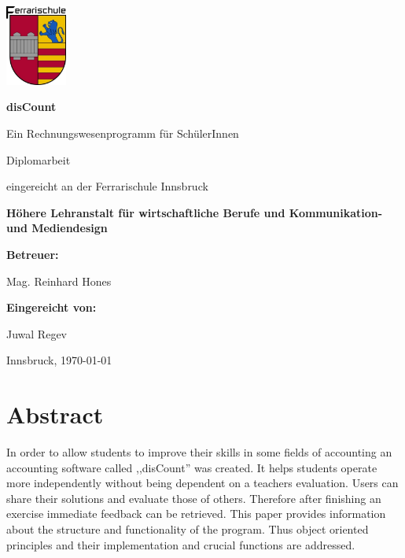 \documentclass[12pt]{report}
\begin{document}
  
   
  
\begin{titlepage}
	\centering
	\includegraphics[width=0.15\textwidth]{images/ferrarilogo.jpg}\par\vspace{1cm}
	\vspace{3cm}
	{\huge \textbf{disCount}\par}
	\vspace{0.5cm}
	{\huge Ein Rechnungswesenprogramm für SchülerInnen}\par
			
	\vspace{1.5cm}
			
	{\huge Diplomarbeit\par}
			
	\vspace{1.5cm}
			
	{\large eingereicht an der Ferrarischule Innsbruck}\par
	\vspace{0.5cm}
	{\large \textbf{Höhere Lehranstalt für wirtschaftliche Berufe und Kommunikation- und Mediendesign}}\par
	\vspace{1cm}
	{\large \textbf{Betreuer:}}\par
	\vspace{0.5cm}
	{\large Mag. Reinhard Hones}\par
	\vspace{1cm}
	{\large \textbf{Eingereicht von:}}\par
	\vspace{0.5cm}
	{\large Juwal Regev}\par
		
	\vfill
	{\large Innsbruck,  \today\par}
\end{titlepage}
  


\newpage
  
  
\section*{Abstract}

In order to allow students to improve their skills in some fields of accounting an accounting software called ,,disCount'' was created. It helps students operate more independently without being dependent on a teachers evaluation. Users can share their solutions and evaluate those of others.
Therefore after finishing an exercise immediate feedback can be retrieved. This paper provides information about the structure and functionality of the program. Thus object oriented principles and their implementation and crucial functions are addressed.\\\\
\end{document}
